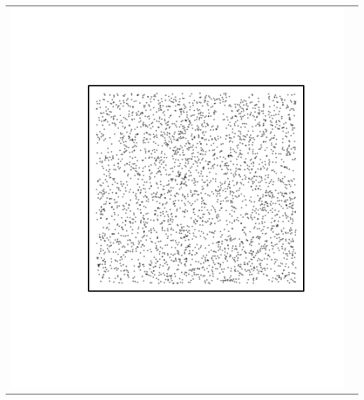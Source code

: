 \documentclass{article}\usepackage{graphicx, color}
\makeatletter
\def\maxwidth{ %
  \ifdim\Gin@nat@width>\linewidth
    \linewidth
  \else
    \Gin@nat@width
  \fi
}
\newenvironment{knitrout}{}{} %
\makeatother
\begin{document}
\vspace*{-1.75in}
\begin{tabular}{cc}
\begin{knitrout}
\definecolor{shadecolor}{rgb}{0.969, 0.969, 0.969}\color{fgcolor}\includegraphics[width=\maxwidth]{figure/unnamed-chunk-35} 
\end{knitrout}


\end{tabular}
\end{document}
